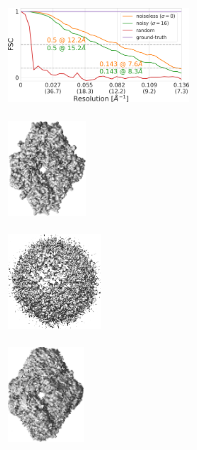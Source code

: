 \begin{figure}[t]
\begin{subfigure}[b]{0.30\linewidth}
        \includegraphics[height=2.5cm]{figures/5j0n_fullcvg_uniformS2_FSC_apr_init_customFSC2.pdf}
        \caption{}\label{fig:5j0n-reconstruction-fsc}
    \end{subfigure}

    \vspace{1em}
    \begin{subfigure}[b]{0.17\linewidth}
        \centering
        \includegraphics[height=2.5cm]{figures/5a1a_quartercov_uniformS2_noise0_gt_.png}
        \caption{}\label{fig:5a1a-noise0-reconstruction-true}
    \end{subfigure}
    \hfill
    \begin{subfigure}[b]{0.16\linewidth}
        \centering
        \includegraphics[height=2.5cm]{figures/5a1a_quartercov_uniformS2_noise0_rand.png}
        \caption{}
    \end{subfigure}
    \hfill
    \begin{subfigure}[b]{0.15\linewidth}
        \centering
        \includegraphics[height=2.5cm]{figures/5a1a_quartercov_uniformS2_noise0_apr_.png}
        \caption{}\label{fig:5a1a-noise0-reconstruction-recovered}

\end{subfigure}
\end{figure}
